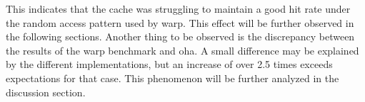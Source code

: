 This indicates that the cache was struggling to maintain a good hit rate under the random access pattern used by warp. This effect will be further observed in the following sections.
Another thing to be observed is the discrepancy between the results of the warp benchmark and oha. A small difference may be explained by the different implementations, but an increase of over 2.5 times exceeds expectations for that case. This phenomenon will be further analyzed in the discussion section.

\throughputremmin
\pgfplotstabletranspose[colnames from=colnames]\Tthroughputremmin{\throughputremmin}

\throughputrems
\pgfplotstabletranspose[colnames from=colnames]\Tthroughputrems{\throughputrems}

\throughputduos
\pgfplotstabletranspose[colnames from=colnames]\Tthroughputduos{\throughputduos}

